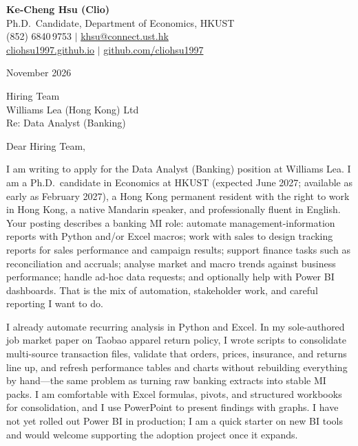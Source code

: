 \documentclass[11pt,letterpaper]{article}
\begin{document}
\noindent
{\bfseries Ke-Cheng Hsu (Clio)}\\
Ph.D.\ Candidate, Department of Economics, HKUST\\
(852) 6840\,9753 \quad $|$ \quad \href{mailto:khsu@connect.ust.hk}{khsu@connect.ust.hk}\\
\href{https://cliohsu1997.github.io/}{cliohsu1997.github.io} \quad $|$ \quad \href{https://github.com/cliohsu1997}{github.com/cliohsu1997}

\vspace{0.4em}
 November 2026

\vspace{0.3em}
\noindent
Hiring Team\\
Williams Lea (Hong Kong) Ltd\\
Re: Data Analyst (Banking)

\vspace{0.15em}
Dear Hiring Team,

I am writing to apply for the Data Analyst (Banking) position at Williams Lea. I am a Ph.D.\ candidate in Economics at HKUST (expected June 2027; available as early as February 2027), a Hong Kong permanent resident with the right to work in Hong Kong, a native Mandarin speaker, and professionally fluent in English. Your posting describes a banking MI role: automate management-information reports with Python and/or Excel macros; work with sales to design tracking reports for sales performance and campaign results; support finance tasks such as reconciliation and accruals; analyse market and macro trends against business performance; handle ad-hoc data requests; and optionally help with Power BI dashboards. That is the mix of automation, stakeholder work, and careful reporting I want to do.

I already automate recurring analysis in Python and Excel. In my sole-authored job market paper on Taobao apparel return policy, I wrote scripts to consolidate multi-source transaction files, validate that orders, prices, insurance, and returns line up, and refresh performance tables and charts without rebuilding everything by hand---the same problem as turning raw banking extracts into stable MI packs. I am comfortable with Excel formulas, pivots, and structured workbooks for consolidation, and I use PowerPoint to present findings with graphs. I have not yet rolled out Power BI in production; I am a quick starter on new BI tools and would welcome supporting the adoption project once it expands.
\end{document}
